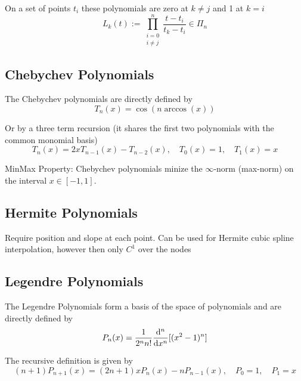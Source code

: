 \documentclass[
    a4paper,
    11pt
]{article}
\begin{document}
On a set of points $t_i$ these polynomials are zero at $k \neq j$ and 1 at $k =
i$
\begin{equation}
    L_k(t) := \prod_{\substack{i=0 \\ i\neq j}}^{n} \frac{t - t_i}{t_k - t_i}
    \in \Pi_n
\end{equation}

\subsection{Chebychev Polynomials}

The Chebychev polynomials are directly defined by
\begin{equation}
    T_n(x) = \cos(n\arccos(x))
\end{equation}

Or by a three term recursion (it shares the first two polynomials with the
common monomial basis)
\begin{equation}
    T_n(x) = 2xT_{n-1}(x) - T_{n-2}(x), \quad T_0(x) = 1, \quad T_1(x) = x
\end{equation}

MinMax Property: Chebychev polynomials minize the $\infty$-norm (max-norm) on
the interval $x \in [-1, 1]$.

\subsection{Hermite Polynomials}

Require position and slope at each point. Can be used for Hermite cubic spline
interpolation, however then only $C^1$ over the nodes

\subsection{Legendre Polynomials}

The Legendre Polynomials form a basis of the space of polynomials and are
directly defined by
\begin{equation}
    P_n(x) = \frac{1}{2^n n!} \dv[n]{}{x}[(x^2 - 1)^n]
\end{equation}

The recursive definition is given by
\begin{equation}
    (n+1)P_{n+1}(x) = (2n+1)xP_n(x) - n P_{n-1}(x), \quad P_0 = 1, \quad P_1=x
\end{equation}


\end{document}
